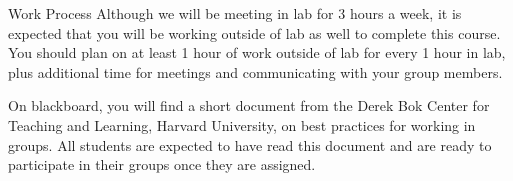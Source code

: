 

\begin{frame}{Work Process}
Although we will be meeting in lab for 3 hours a week, it is expected that you will be working outside of lab as well to complete this course. You should plan on at least 1 hour of work outside of lab for every 1 hour in lab, plus additional time for meetings and communicating with your group members.

On blackboard, you will find a short document from the Derek Bok Center for Teaching and Learning, Harvard University, on best practices for working in groups. All students are expected to have read this document and are ready to participate in their groups once they are assigned. 
\end{frame}


